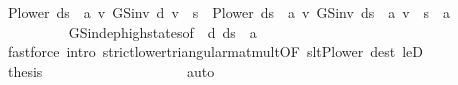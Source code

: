 \begin{isabellebody}
\ {\isachardoublequoteopen}{\isacharparenleft}{\kern0pt}P{\isacharunderscore}{\kern0pt}lower\ {\isacharparenleft}{\kern0pt}d{\isacharparenleft}{\kern0pt}s\ {\isacharcolon}{\kern0pt}{\isacharequal}{\kern0pt}\ a{\isacharparenright}{\kern0pt}{\isacharparenright}{\kern0pt}\ {\isacharasterisk}{\kern0pt}v\ GS{\isacharunderscore}{\kern0pt}inv\ d\ v{\isacharparenright}{\kern0pt}\ {\isachardollar}{\kern0pt}\ s\ {\isacharequal}{\kern0pt}\ {\isacharparenleft}{\kern0pt}P{\isacharunderscore}{\kern0pt}lower\ {\isacharparenleft}{\kern0pt}d{\isacharparenleft}{\kern0pt}s\ {\isacharcolon}{\kern0pt}{\isacharequal}{\kern0pt}\ a{\isacharparenright}{\kern0pt}{\isacharparenright}{\kern0pt}\ {\isacharasterisk}{\kern0pt}v\ GS{\isacharunderscore}{\kern0pt}inv\ {\isacharparenleft}{\kern0pt}d{\isacharparenleft}{\kern0pt}s\ {\isacharcolon}{\kern0pt}{\isacharequal}{\kern0pt}\ a{\isacharparenright}{\kern0pt}{\isacharparenright}{\kern0pt}\ v{\isacharparenright}{\kern0pt}\ {\isachardollar}{\kern0pt}\ s{\isachardoublequoteclose}\ \ a\isanewline
\ \ \ \ \ \ \ \ \isamarkupfalse%
\ GS{\isacharunderscore}{\kern0pt}indep{\isacharunderscore}{\kern0pt}high{\isacharunderscore}{\kern0pt}states{\isacharbrackleft}{\kern0pt}of\ {\isacharunderscore}{\kern0pt}\ d\ {\isachardoublequoteopen}d{\isacharparenleft}{\kern0pt}s\ {\isacharcolon}{\kern0pt}{\isacharequal}{\kern0pt}\ a{\isacharparenright}{\kern0pt}{\isachardoublequoteclose}{\isacharbrackright}{\kern0pt}\ \isanewline
\ \ \ \ \ \ \ \ \isamarkupfalse%
\ {\isacharparenleft}{\kern0pt}fastforce\ intro{\isacharbang}{\kern0pt}{\isacharcolon}{\kern0pt}\ strict{\isacharunderscore}{\kern0pt}lower{\isacharunderscore}{\kern0pt}triangular{\isacharunderscore}{\kern0pt}mat{\isacharunderscore}{\kern0pt}mult{\isacharbrackleft}{\kern0pt}OF\ slt{\isacharunderscore}{\kern0pt}P{\isacharunderscore}{\kern0pt}lower{\isacharbrackright}{\kern0pt}\ dest{\isacharbang}{\kern0pt}{\isacharcolon}{\kern0pt}\ leD{\isacharparenright}{\kern0pt}\isanewline
\ \ \ \ \ \ \isamarkupfalse%
\ \isamarkupfalse%
\ {\isacharquery}{\kern0pt}thesis\isanewline
\ \ \ \ \ \ \ \ \isamarkupfalse%
\ {\isacharasterisk}{\kern0pt}\isanewline
\ \ \ \ \ \ \ \ \isamarkupfalse%
\ auto\isanewline
\ \ \ \ \isamarkupfalse%
\isanewline
\ \ \ \ \isamarkupfalse%

\end{isabellebody}
